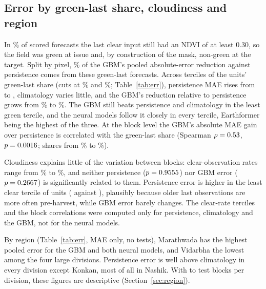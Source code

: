 \documentclass[journal]{IEEEtran}
\begin{document}
\subsection{Error by green-last share, cloudiness and region}
\label{sec:err}
In \finxGreenLastShare\% of scored forecasts the last clear input still had an NDVI of at least 0.30, so the field was green at issue and, by construction of the mask, non-green at the target. Split by pixel, \finyGreenGainShare\% of the GBM's pooled absolute-error reduction against persistence comes from these green-last forecasts. Across terciles of the units' green-last share (cuts at \finxGreenCutLo\% and \finxGreenCutHi\%; Table~\ref{tab:err}), persistence MAE rises from \finxPersMAEGreenOne{} to \finxPersMAEGreenThree, climatology varies little, and the GBM's reduction relative to persistence grows from \finxGbmGainGreenOne\% to \finxGbmGainGreenThree\%. The GBM still beats persistence and climatology in the least green tercile, and the neural models follow it closely in every tercile, Earthformer being the highest of the three. At the block level the GBM's absolute MAE gain over persistence is correlated with the green-last share (Spearman $\rho=0.53$, $p=0.0016$; shares from \finyRangeGreenLo\% to \finyRangeGreenHi\%).

Cloudiness explains little of the variation between blocks: clear-observation rates range from \finyRangeClearLo\% to \finyRangeClearHi\%, and neither persistence ($p=0.9555$) nor GBM error ($p=0.2667$) is significantly related to them. Persistence error is higher in the least clear tercile of units (\finPersMAEClearLow{} against \finPersMAEClearHigh), plausibly because older last observations are more often pre-harvest, while GBM error barely changes. The clear-rate terciles and the block correlations were computed only for persistence, climatology and the GBM, not for the neural models.

By region (Table~\ref{tab:err}, MAE only, no tests), Marathwada has the highest pooled error for the GBM and both neural models, and Vidarbha the lowest among the four large divisions. Persistence error is well above climatology in every division except Konkan, most of all in Nashik. With \finyNBlocksKonkan{} to \finyNBlocksVidarbha{} test blocks per division, these figures are descriptive (Section~\ref{sec:region}).
\end{document}
